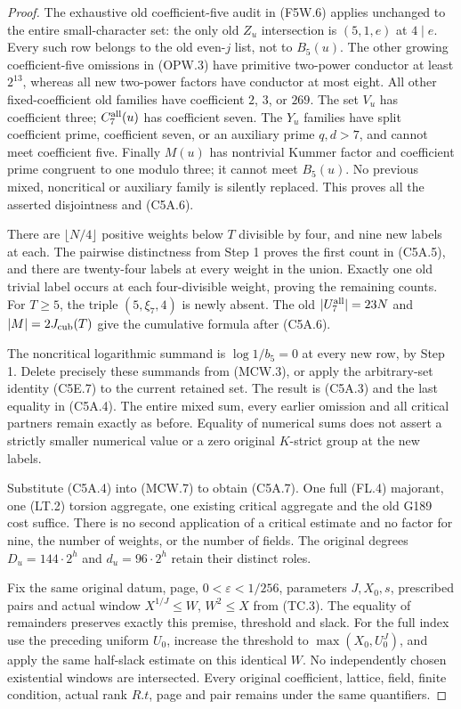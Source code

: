 \begin{proof}
The exhaustive old coefficient-five audit in (F5W.6) applies
unchanged to the entire small-character set: the only old
$Z_u$ intersection is $(5,1,e)$ at $4\mid e$.
Every such row belongs to the old even-$j$ list, not to $B_5(u)$.
The other growing coefficient-five omissions in (OPW.3) have
primitive two-power conductor at least $2^{13}$, whereas all
new two-power factors have conductor at most eight.
All other fixed-coefficient old families have coefficient
$2$, $3$, or $269$. The set $V_u$ has coefficient three;
$C_7^{\rm all}(u)$ has coefficient seven.
The $Y_u$ families have split coefficient prime, coefficient
seven, or an auxiliary prime $q,d>7$, and cannot meet coefficient five.
Finally $M(u)$ has nontrivial Kummer factor and coefficient
prime congruent to one modulo three; it cannot meet $B_5(u)$.
No previous mixed, noncritical or auxiliary family is silently replaced.
This proves all the asserted disjointness and (C5A.6).

There are $\lfloor N/4\rfloor$ positive weights below $T$
divisible by four, and nine new labels at each.
The pairwise distinctness from Step 1 proves the first count
in (C5A.5), and there are twenty-four labels at every weight
in the union. Exactly one old trivial label occurs at each
four-divisible weight, proving the remaining counts.
For $T\geq5$, the triple $(5,\xi_7,4)$ is newly absent.
The old $|U_7^{\rm all}|=23N$ and $|M|=2J_{\rm cub}(T)$
give the cumulative formula after (C5A.6).

The noncritical logarithmic summand is $\log1/b_5=0$ at every
new row, by Step 1. Delete precisely these summands from (MCW.3),
or apply the arbitrary-set identity (C5E.7) to the current retained set.
The result is (C5A.3) and the last equality in (C5A.4).
The entire mixed sum, every earlier omission and all critical
partners remain exactly as before. Equality of numerical sums
does not assert a strictly smaller numerical value or a zero
original $K$-strict group at the new labels.

Substitute (C5A.4) into (MCW.7) to obtain (C5A.7).
One full (FL.4) majorant, one (LT.2) torsion aggregate,
one existing critical aggregate and the old G189 cost suffice.
There is no second application of a critical estimate and no
factor for nine, the number of weights, or the number of fields.
The original degrees $D_u=144\cdot2^h$ and $d_u=96\cdot2^h$
retain their distinct roles.

Fix the same original datum, page, $0<\varepsilon<1/256$,
parameters $J,X_0,s$, prescribed pairs and actual window
$X^{1/J}\leq W$, $W^2\leq X$ from (TC.3).
The equality of remainders preserves exactly this premise,
threshold and slack. For the full index use the preceding
uniform $U_0$, increase the threshold to $\max(X_0,U_0^J)$,
and apply the same half-slack estimate on this identical $W$.
No independently chosen existential windows are intersected.
Every original coefficient, lattice, field, finite condition,
actual rank $R.t$, page and pair remains under the same quantifiers.
\end{proof}

